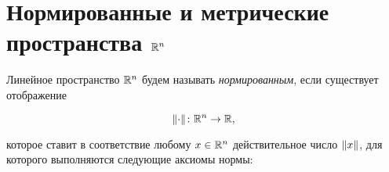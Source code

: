 \documentclass[../../main.tex]{subfiles}
\begin{document}
% 
% 
% 
%  
% 
% 
% 
% 
% 

\section{Нормированные и метрические пространства $\mathbb{R}^n$}

Линейное пространство $\mathbb{R}^n$ будем называть 
\emph{нормированным}, если существует отображение

\begin{equation}
 \label{norm-disp}
 \lVert\cdot \rVert\colon \mathbb{R}^n \to \mathbb{R},
\end{equation}

которое ставит в соответствие любому $x \in \mathbb{R}^n$ действительное 
число $\lVert{x}\rVert$, для которого выполняются следующие аксиомы нормы:
\end{document}
